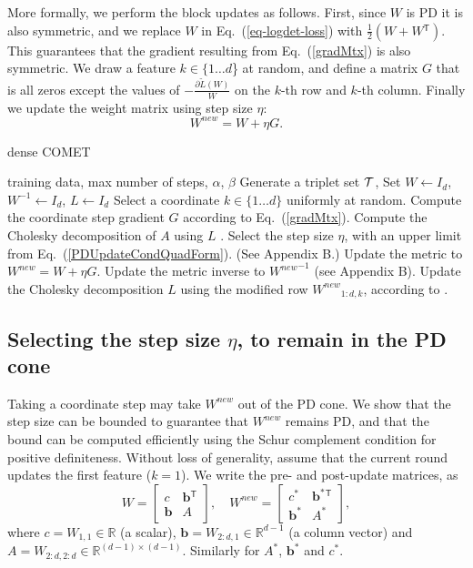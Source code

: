 \documentclass[twoside,11pt]{article}
\newcommand\mat[1]{{#1}}
\renewcommand\vec[1]{\mathbf{#1}}
\newcommand{\T}{{}^\mathsf{T}}
\newcommand{\W}{\mat{W}}
\newcommand{\newW}{{\mat{W^{new}}}}
\newcommand{\R}{\mathbb{R}}
\newcommand{\tL}{\tilde{L}(\W)}
\newcommand{\cholL}{\mat{L}}
\newcommand{\A}{\mat{A}}
\newcommand{\B}{\vec{b}}
\newcommand{\C}{c}
\newcommand{\grd}{\frac{\partial \tL}{\W}}
\newcommand{\Wvec}{\W_{2:d,1}}
\newcommand{\Wscalar}{\W_{1,1}}
\renewcommand{\eqref}[1]{Eq.~(\ref{#1})}
\begin{document}
More formally, we perform the block updates as follows. First, since $\W$ is PD it is also symmetric, and we replace $\W$ in \eqref{eq-logdet-loss} with $\tfrac{1}{2}(\W + \W\T)$. This guarantees that the gradient resulting from \eqref{gradMtx} is also symmetric. We draw a feature $k \in \{1 \ldots d$\} at random, and define a matrix $\mat{G}$ that is all zeros except the values of $-\grd$ on the $k$-th row and $k$-th column. Finally we update the weight matrix using step size $\eta$:
\begin{equation}
    \newW = \W +\eta \mat{G}.
\label{updateEq}
\end{equation}

\begin{algorithm}[th]
   \caption{dense COMET}
   \label{alg:comet}
\begin{algorithmic}[1]
    training data, max number of steps, $\alpha$, $\beta$
   \STATE Generate a triplet set $\cal{T}$, Set  $\W  \leftarrow I_d$, $\W^{-1}  \leftarrow I_d$, $\cholL  \leftarrow I_d$
   \REPEAT 
   \STATE Select a coordinate $k \in \{1 \ldots d\}$ uniformly at random.
   \STATE Compute the coordinate step gradient $\mat{G}$ according to \eqref{gradMtx}.
   \STATE Compute the Cholesky decomposition of $\A$ using $\cholL$ \citep{Davis05rowchol}.
   \STATE Select the step size $\eta$, with an upper limit from \eqref{PDUpdateCondQuadForm}. (See Appendix B.)
   \STATE Update the metric to $\newW=\W+\eta G$.
   \STATE Update the metric inverse to $\newW^{-1}$ (see Appendix B).
   \STATE Update the Cholesky decomposition $\cholL$ using the modified row $\newW_{1:d,k}$, according to \citet{Davis05rowchol}.
\end{algorithmic}
\end{algorithm}

\subsection{Selecting the step size $\eta$, to remain in the PD cone}\label{subsec:step}
Taking a coordinate step may take $\newW$ out of the PD cone. We show that the step size can be bounded to guarantee that $\newW$ remains PD, and that the bound can be computed efficiently using the Schur complement condition for positive definiteness. Without loss of generality, assume that the current round updates the first feature ($k = 1$). We write the pre- and post-update
matrices, as
\begin{equation}
  \W = \left[ \begin{matrix} \C & \B\T \\ \B & A \end{matrix} \right],
  \quad
  \newW = \left[ \begin{matrix} \C^* & \B^*\T \\ \B^* & A^* \end{matrix} \right],
  \label{schurNotationPreUpdate}
\end{equation}
 where $\C = \Wscalar \in \R$ (a scalar), $\B = \Wvec \in
\R^{d-1}$ (a column vector) and $A = \W_{2:d,2:d} \in \R^{(d-1)
\times (d-1)}$. Similarly for $A^*$, $\B^*$ and $\C^*$.
\end{document}
